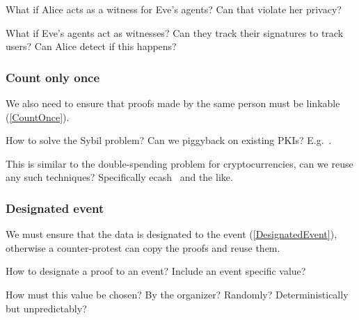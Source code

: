 \begin{frame}
  \begin{question}
    What if Alice acts as a witness for Eve's agents?
    Can that violate her privacy?
  \end{question}
  \begin{question}
    What if Eve's agents act as witnesses?
    Can they track their signatures to track users?
    Can Alice detect if this happens?
  \end{question}
\end{frame}

\subsubsection{Count only once}

We also need to ensure that proofs made by the same person must be linkable 
(\cref{CountOnce}).

\begin{frame}
  \begin{question}
    How to solve the Sybil problem?
    Can we piggyback on existing \acp{PKI}?
    E.g.~\cite{Cinderella}.
  \end{question}
  \begin{question}
    This is similar to the double-spending problem for cryptocurrencies, can 
    we reuse any such techniques?
    Specifically ecash~\cite{ecash} and the like.
  \end{question}
\end{frame}

\subsubsection{Designated event}

We must ensure that the data is designated to the event 
(\cref{DesignatedEvent}), otherwise a counter-protest can copy the proofs and 
reuse them.

\begin{frame}
  \begin{question}
    How to designate a proof to an event?
    Include an event specific value?
  \end{question}
  \begin{question}
    How must this value be chosen?
    By the organizer?
    Randomly?
    Deterministically but unpredictably?
  \end{question}
\end{frame}

